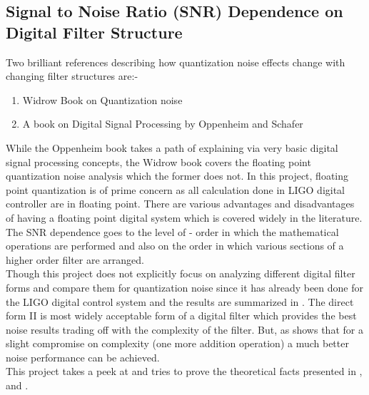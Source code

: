 \documentclass[colorlinks=true,pdfstartview=FitV,linkcolor=blue,
            citecolor=red,urlcolor=magenta]{ligodoc}
\begin{document}
	\subsection{Signal to Noise Ratio (SNR) Dependence on Digital Filter Structure} Two brilliant references describing how quantization noise effects change with changing filter structures are:-
	\begin{enumerate}
		\item Widrow Book on Quantization noise \cite{Widrow}
		\item A book on Digital Signal Processing by Oppenheim and Schafer \cite{Oppenheim}
	\end{enumerate}
	While the Oppenheim book takes a path of explaining via very basic digital signal processing concepts, the Widrow book covers the floating point quantization noise analysis which the former does not. In this project, floating point quantization is of prime concern as all calculation done in LIGO digital controller are in floating point. There are various advantages and disadvantages of having a floating point digital system which is covered widely in the literature. 
	The SNR dependence goes to the level of - order in which the mathematical operations are performed and also on the order in which various sections of a higher order filter are arranged. \\ 
		Though this project does not explicitly focus on analyzing different digital filter forms and compare them for quantization noise since it has already been done for the LIGO digital control system and the results are summarized in \cite{matts}. The direct form II is most widely acceptable form of a digital filter which provides the best noise results trading off with the complexity of the filter. But, as \cite{matts} shows that for a slight compromise on complexity (one more addition operation) a much better noise performance can be achieved. \\ This project takes a peek at and tries to prove the theoretical facts presented in \cite{Widrow}, \cite{Oppenheim} and \cite{matts} . 
\end{document}
